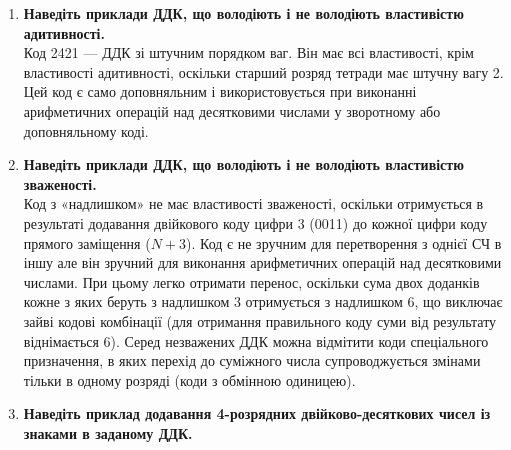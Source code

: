 \documentclass[12pt,a4paper]{article}
\begin{document}
\begin{enumerate}
    \vspace{1em}

    \item \textbf{Наведіть приклади ДДК, що володіють і не володіють властивістю адитивності.} \\
    Код 2421 --- ДДК зі штучним порядком ваг. Він має всі властивості, крім властивості адитивності, оскільки старший розряд тетради має штучну вагу 2. Цей код є само доповняльним і використовується при виконанні арифметичних операцій над десятковими числами у зворотному або доповняльному коді.

    \vspace{1em}

    \item \textbf{Наведіть приклади ДДК, що володіють і не володіють властивістю зваженості.} \\
    Код з «надлишком» не має властивості зваженості, оскільки отримується в результаті додавання двійкового коду цифри 3 (0011) до кожної цифри коду прямого заміщення ($N+3$). Код є не зручним для перетворення з однієї СЧ в іншу але він зручний для виконання арифметичних операцій над десятковими числами. 
    При цьому легко отримати перенос, оскільки сума двох доданків кожне з яких беруть з надлишком 3 отримується з надлишком 6, що виключає зайві кодові комбінації (для отримання правильного коду суми від результату віднімається 6). 
    Серед незважених ДДК можна відмітити коди спеціального призначення, в яких перехід до суміжного числа супроводжується змінами тільки в одному розряді (коди з обмінною одиницею).

    \vspace{1em}

    \item \textbf{Наведіть приклад додавання 4-розрядних двійково-десяткових чисел із знаками в заданому ДДК.} \\
    \noindent

\end{enumerate}
\end{document}
